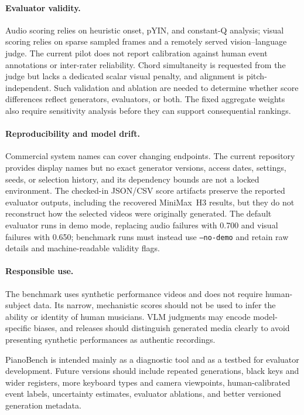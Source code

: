 \documentclass{article}
\begin{document}
\paragraph{Evaluator validity.}
Audio scoring relies on heuristic onset, pYIN, and constant-Q analysis; visual scoring relies on sparse sampled frames and a remotely served vision--language judge. The current pilot does not report calibration against human event annotations or inter-rater reliability. Chord simultaneity is requested from the judge but lacks a dedicated scalar visual penalty, and alignment is pitch-independent. Such validation and ablation are needed to determine whether score differences reflect generators, evaluators, or both. The fixed aggregate weights also require sensitivity analysis before they can support consequential rankings.

\paragraph{Reproducibility and model drift.}
Commercial system names can cover changing endpoints. The current repository provides display names but no exact generator versions, access dates, settings, seeds, or selection history, and its dependency bounds are not a locked environment. The checked-in JSON/CSV score artifacts preserve the reported evaluator outputs, including the recovered MiniMax~H3 results, but they do not reconstruct how the selected videos were originally generated. The default evaluator runs in demo mode, replacing audio failures with 0.700 and visual failures with 0.650; benchmark runs must instead use \texttt{--no-demo} and retain raw details and machine-readable validity flags.

\paragraph{Responsible use.}
The benchmark uses synthetic performance videos and does not require human-subject data. Its narrow, mechanistic scores should not be used to infer the ability or identity of human musicians. VLM judgments may encode model-specific biases, and releases should distinguish generated media clearly to avoid presenting synthetic performances as authentic recordings.

PianoBench is intended mainly as a diagnostic tool and as a testbed for evaluator development. Future versions should include repeated generations, black keys and wider registers, more keyboard types and camera viewpoints, human-calibrated event labels, uncertainty estimates, evaluator ablations, and better versioned generation metadata.
\end{document}
